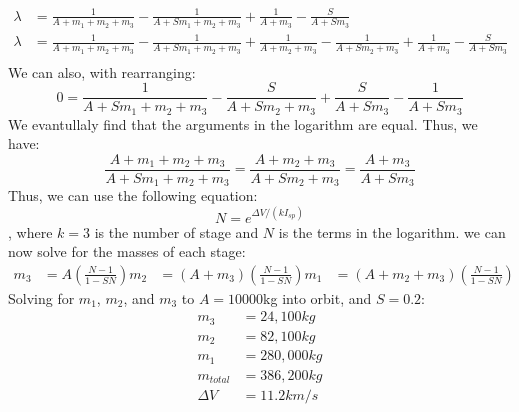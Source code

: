 \documentclass[11pt]{report}
\begin{document}
\begin{example}
\begin{align*}
        \lambda &= \frac{1}{A + m_1 + m_2 + m_3} - \frac{1}{A + Sm_1 + m_2 + m_3} + \frac{1}{A + m_3} - \frac{S}{A + Sm_3} \\ 
        \lambda &= \frac{1}{A + m_1 + m_2 + m_3} - \frac{1}{A + Sm_1 + m_2 + m_3} + \frac{1}{A + m_2 + m_3} - \frac{1}{A + Sm_2 + m_3} + \frac{1}{A + m_3} - \frac{S}{A + Sm_3} \\
        \end{align*}
    We can also, with rearranging:
    $$
    0 = \frac{1}{A + Sm_1 + m_2 + m_3} - \frac{S}{A + Sm_2 + m_3} + \frac{S}{A + Sm_3} - \frac{1}{A + Sm_3}
    $$ 
    We evantullaly find that the arguments in the logarithm are equal. Thus, we have:
    $$
    \frac{A + m_1 + m_2 + m_3}{A + Sm_1 + m_2 + m_3} = \frac{A + m_2 + m_3}{A + Sm_2 + m_3} = \frac{A + m_3}{A + Sm_3}
    $$
    Thus, we can use the following equation:
    \begin{equation}
        N = e^{\Delta V / (kI_{sp})}
    \end{equation}
    , where $k=3$ is the number of stage and $N$ is the terms in the logarithm. we can now solve for the masses of each stage:
    \begin{align*}
        m_3 &= A\left(\frac{N-1}{1-SN}\right)
        m_2 &= (A + m_3)\left(\frac{N-1}{1-SN}\right)
        m_1 &= (A + m_2 + m_3)\left(\frac{N-1}{1-SN}\right)
    \end{align*}
    Solving for $m_1$, $m_2$, and $m_3$ to $A=10000$kg into orbit, and $S=0.2$:
    \begin{align*}
        m_3 &= 24,100kg \\
        m_2 &= 82,100kg \\
        m_1 &= 280,000kg \\
        m_{total} &= 386,200kg \\
        \Delta V &= 11.2km/s
    \end{align*}
\end{example}
\end{document}
